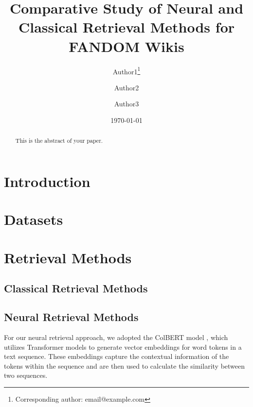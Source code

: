 \documentclass{article}
\title{Comparative Study of Neural and Classical Retrieval Methods for FANDOM Wikis}
\author{Author1\thanks{Corresponding author: email@example.com} \and Author2 \and Author3}
\date{\today}
\begin{document}
\maketitle

\begin{abstract}
This is the abstract of your paper.
\end{abstract}

\section{Introduction}

\section{Datasets}

\section{Retrieval Methods}
\subsection{Classical Retrieval Methods}

\subsection{Neural Retrieval Methods}
For our neural retrieval approach, we adopted the ColBERT \cite{khattab2020colbert} model , which utilizes Transformer models to generate vector embeddings for word tokens in a text sequence. These embeddings capture the contextual information of the tokens within the sequence and are then used to calculate the similarity between two sequences.
\end{document}
